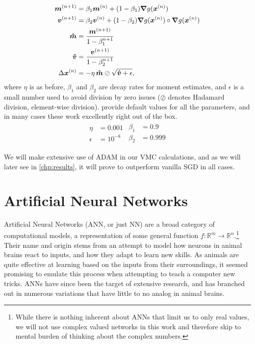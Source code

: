 \documentclass[Thesis.tex]{subfiles}
\begin{document}
\begin{align}
  \bm{m}^{(n+1)} &= \beta_1 \bm{m}^{(n)} + (1 - \beta_1)\grad{g(\bm{x}^{(n)})}\\
  \bm{v}^{(n+1)} &= \beta_2 \bm{v}^{(n)} + (1 - \beta_2)\grad{g(\bm{x}^{(n)})}\circ\grad{g(\bm{x}^{(n)})}\\
  \bm{\hat m} &= \frac{\bm{m}^{(n+1)}}{1 - \beta_1^{n+1}}\\
  \bm{\hat v} &= \frac{\bm{v}^{(n+1)}}{1 - \beta_2^{n+1}}\\
  \Delta \bm{x}^{(n)}&= -\eta\, \bm{\hat m}\oslash\sqrt{\bm{\hat v} + \epsilon},
\end{align}
where $\eta$ is as before, $\beta_1$ and $\beta_2$ are decay rates for moment
estimates, and $\epsilon$ is a small number used to avoid division by zero
issues ($\oslash$ denotes Hadamard division, element-wise division). \textcite{KingmaB14} provide default values for all the parameters, and
in many cases these work excellently right out of the box.
\begin{align}
  \label{eq:adam-default-parameters}
  \begin{split}
    \eta &= 0.001\\
    \epsilon &= 10^{-8}
  \end{split}
  \begin{split}
    \beta_1 &= 0.9\\
    \beta_2 &= 0.999
  \end{split}
\end{align}

We will make extensive use of ADAM in our VMC calculations, and as we will later
see in \cref{chp:results}, it will prove to outperform vanilla SGD in all cases.


\section{Artificial Neural Networks}

Artificial Neural Networks (ANN, or just NN) are a broad category of
computational models, a representation of some general function $f:
\mathbb{R}^m\to\mathbb{R}^n$.\footnote{While there is nothing inherent about
  ANNs that limit us to only real values, we will not use
  complex valued networks in this work and therefore skip to mental burden of
  thinking about the complex numbers.} Their name and origin stems from an attempt to
model how neurons in animal brains react to inputs, and how they adapt to learn
new skills. As animals are quite effective at learning based on the inputs from
their surroundings, it seemed promising to emulate this
process when attempting to teach a computer new tricks. ANNs have since been the
target of extensive research, and has branched out in numerous variations that
have little to no analog in animal brains.
\end{document}
